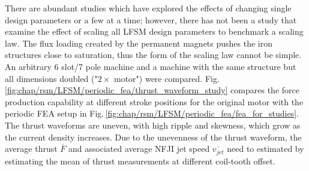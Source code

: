             
            There are abundant studies which have explored the effects of changing single design parameters or a few at a time; however, there has not been a study that examine the effect of scaling all \acs{LFSM} design parameters to benchmark a scaling law. The flux loading created by the permanent magnets pushes the iron structures close to saturation, thus the form of the scaling law cannot be simple. An arbitrary 6 slot/7 pole machine and a machine with the same structure but all dimensions doubled ("$2\times$ motor") were compared. Fig.\,\ref{fig:chap/rsm/LFSM/periodic_fea/thrust_waveform_study} compares the force production capability at different stroke positions for the original motor with the periodic \acs{FEA} setup in Fig.\,\ref{fig:chap/rsm/LFSM/periodic_fea/fea_for_studies}. The thrust waveforms are uneven, with high ripple and skewness, which grow as the current density increases. Due to the unevenness of the thrust waveform, the average thrust $\overline{F}$ and associated average \acs{NFJI} jet speed $\overline{v_{jet}}$ need to estimated by estimating the mean of thrust measurements at different coil-tooth offset.
            

